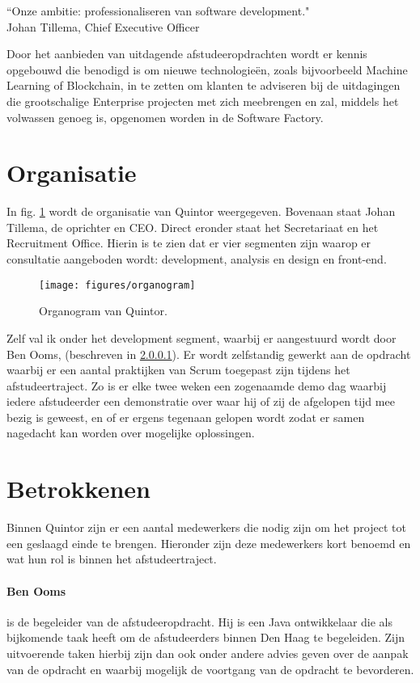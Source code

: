\begin{formal}
  \label{visie}
  ``Onze ambitie: professionaliseren van software development."
  \\ Johan Tillema, Chief Executive Officer
\end{formal}

Door het aanbieden van uitdagende afstudeeropdrachten wordt er kennis opgebouwd die benodigd is om nieuwe technologieën, zoals bijvoorbeeld Machine Learning of Blockchain, in te zetten om klanten te adviseren bij de uitdagingen die grootschalige Enterprise projecten met zich meebrengen en zal, middels het volwassen genoeg is, opgenomen worden in de Software Factory.

\section{Organisatie}
In fig. \ref{organogram} wordt de organisatie van Quintor weergegeven. Bovenaan staat Johan Tillema, de oprichter en CEO. Direct eronder staat het Secretariaat en het Recruitment Office. Hierin is te zien dat er vier segmenten zijn waarop er consultatie aangeboden wordt: development, analysis en design en front-end.

\begin{figure}[h]
  \texttt{[image: figures/organogram]}
  \caption{Organogram van Quintor.}
  \label{organogram}
\end{figure}

\newpage
Zelf val ik onder het development segment, waarbij er aangestuurd wordt door Ben Ooms, (beschreven in \ref{begeleider}). Er wordt zelfstandig gewerkt aan de opdracht waarbij er een aantal praktijken van Scrum toegepast zijn tijdens het afstudeertraject. Zo is er elke twee weken een zogenaamde demo dag waarbij iedere afstudeerder een demonstratie over waar hij of zij de afgelopen tijd mee bezig is geweest, en of er ergens tegenaan gelopen wordt zodat er samen nagedacht kan worden over mogelijke oplossingen.

\section{Betrokkenen}

Binnen Quintor zijn er een aantal medewerkers die nodig zijn om het project tot een geslaagd einde te brengen. Hieronder zijn deze medewerkers kort benoemd en wat hun rol is binnen het afstudeertraject.

\paragraph{Ben Ooms} \label{begeleider} is de begeleider van de afstudeeropdracht. Hij is een Java ontwikkelaar die als bijkomende taak heeft om de afstudeerders binnen Den Haag te begeleiden. Zijn uitvoerende taken hierbij zijn dan ook onder andere advies geven over de aanpak van de opdracht en waarbij mogelijk de voortgang van de opdracht te bevorderen.

